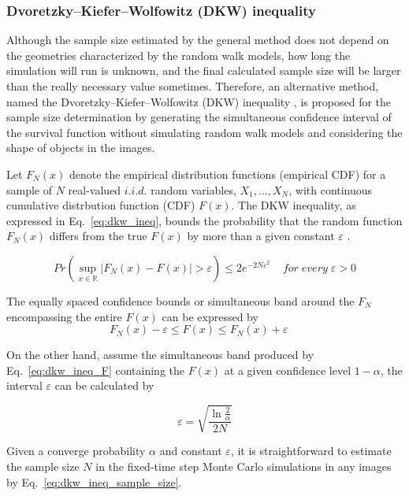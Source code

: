 \subsubsection{Dvoretzky–Kiefer–Wolfowitz (DKW) inequality}

Although the sample size estimated by the general method does not
depend on the geometries characterized by the random walk models, how
long the simulation will run is unknown, and the final calculated
sample size will be larger than the really necessary value
sometimes. Therefore, an alternative method, named the
Dvoretzky–Kiefer–Wolfowitz (DKW)
inequality \cite{dvoretzky1956asymptotic}, is proposed for the sample
size determination by generating the simultaneous confidence interval
of the survival function without simulating random walk models and
considering the shape of objects in the images.

Let $F_N(x)$ denote the empirical distribution functions (empirical
CDF) for a sample of $N$ real-valued $i.i.d.$ random variables,
$X_{1}, ... , X_{N}$, with continuous cumulative distrbution function
(CDF) $F(x)$. The DKW inequality, as expressed in
Eq.~\ref{eq:dkw_ineq}, bounds the probability that the random function
$F_{N}(x)$ differs from the true $F(x)$ by more than a given constant
$\varepsilon$
\cite{dvoretzky1956asymptotic}.

\begin{equation}\label{eq:dkw_ineq}
  Pr(\sup_{x \in \mathbb{R}} |F_{N}(x) - F(x)| > \varepsilon) \leq
  2e^{-2N\varepsilon^2} \;\; \;\; for \; every \; \varepsilon > 0
\end{equation}

The equally spaced confidence bounds or simultaneous band around the
$F_{N}$ encompassing the entire $F(x)$ can be expressed by
\begin{equation}\label{eq:dkw_ineq_F}
  F_{N}(x) - \varepsilon \leq F(x) \leq F_N(x) + \varepsilon \; \; \; \; 
\end{equation}

On the other hand, assume the simultaneous band produced by
Eq.~\ref{eq:dkw_ineq_F} containing the $F(x)$ at a given confidence
level $1-\alpha$, the interval $\varepsilon$ can be calculated by

\begin{equation}\label{eq:dkw_ineq_sample_size}
  \varepsilon = \sqrt{\frac{\ln{\frac{2}{\alpha}}}{2N}}
\end{equation}


Given a converge probability $\alpha$ and constant $\varepsilon$, it
is straightforward to estimate the sample size $N$ in the fixed-time
step Monte Carlo simulations in any images by
Eq.~\ref{eq:dkw_ineq_sample_size}.

